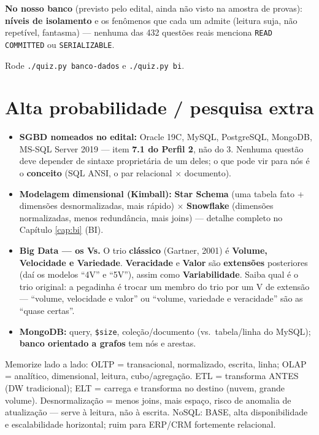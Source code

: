 \begin{jacaiu}
\textbf{No nosso banco} (previsto pelo edital, ainda não visto na amostra de
provas): \textbf{níveis de isolamento} e os fenômenos que cada um admite
(leitura suja, não repetível, fantasma) --- nenhuma das 432 questões reais
menciona \texttt{READ COMMITTED} ou \texttt{SERIALIZABLE}.

Rode \texttt{./quiz.py banco-dados} e \texttt{./quiz.py bi}.
\end{jacaiu}

\section{Alta probabilidade / pesquisa extra}

\begin{itemize}
\item \textbf{SGBD nomeados no edital:} Oracle 19C, MySQL, PostgreSQL,
MongoDB, MS-SQL Server 2019 --- item \textbf{7.1 do Perfil 2}, não do 3.
Nenhuma questão deve depender de sintaxe proprietária de um deles; o que pode
vir para nós é o \textbf{conceito} (SQL ANSI, o par relacional $\times$
documento).
\item \textbf{Modelagem dimensional (Kimball):} \textbf{Star Schema} (uma
tabela fato + dimensões desnormalizadas, mais rápido) $\times$
\textbf{Snowflake} (dimensões normalizadas, menos redundância, mais joins)
--- detalhe completo no Capítulo \ref{cap:bi} (BI).
\item \textbf{Big Data --- os Vs.} O trio \textbf{clássico} (Gartner, 2001) é
\textbf{Volume, Velocidade e Variedade}. \textbf{Veracidade} e \textbf{Valor}
são \textbf{extensões} posteriores (daí os modelos ``4V'' e ``5V''), assim
como \textbf{Variabilidade}. Saiba qual é o trio original: a pegadinha é
trocar um membro do trio por um V de extensão --- ``volume, velocidade e
valor'' ou ``volume, variedade e veracidade'' são as ``quase certas''.
\item \textbf{MongoDB:} query, \texttt{\$size}, coleção/documento (vs.\
tabela/linha do MySQL); \textbf{banco orientado a grafos} tem nós e arestas.
\end{itemize}

\begin{comosair}
Memorize lado a lado: OLTP = transacional, normalizado, escrita, linha; OLAP
= analítico, dimensional, leitura, cubo/agregação. ETL = transforma ANTES (DW
tradicional); ELT = carrega e transforma no destino (nuvem, grande volume).
Desnormalização = menos joins, mais espaço, risco de anomalia de atualização
--- serve à leitura, não à escrita. NoSQL: BASE, alta disponibilidade e
escalabilidade horizontal; ruim para ERP/CRM fortemente relacional.
\end{comosair}
